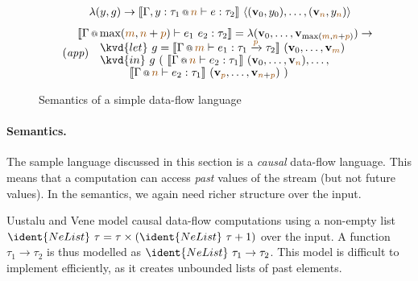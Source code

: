\begin{figure}
\begin{equation}
\begin{array}{l}
  \qquad\lambda (y, g) \rightarrow \sem{ \coctx{\Gamma,y:\tau_1}{\aclrd{n}} \vdash e : \tau_2 
    }~\langle (\mathbf{v}_0, y_0), \ldots, (\mathbf{v}_{ \aclrd{n}  }, y_{ \aclrd{n} } ) \rangle
\end{array}
\end{equation}
\vspace{-0.5em}
\begin{equation*}
\tag{\emph{app}}
\hspace{-1.5em}
\begin{array}{l}
  \sem{\coctx{\Gamma}{\textnormal{max}(\aclrd{m}, \aclrd{n}+\aclrd{p})} \vdash e_1~e_2 : \tau_2 } = 
    \lambda (\mathbf{v}_0, \ldots, \mathbf{v}_{ \textnormal{max}(\aclrd{m}, \aclrd{n}+\aclrd{p}) } ) \rightarrow \\[-0.1em]
  \qquad\kvd{let}~g=\sem{ \coctx{\Gamma}{\aclrd{m}} \vdash e_1 : \tau_1 \xrightarrow{\aclrd{p}} \tau_2 
    }~(\mathbf{v}_0, \ldots, \mathbf{v}_{ \aclrd{m} })\\[-0.1em]
  \qquad\kvd{in}~g~(~\sem{ \coctx{\Gamma}{\aclrd{n}} \vdash e_2 : \tau_1 }~(\mathbf{v}_0, \ldots, \mathbf{v}_{ \aclrd{n} }),\ldots, \\[-0.1em]
  \qquad\qquad\;~\sem{ \coctx{\Gamma}{\aclrd{n}} \vdash e_2 : \tau_1 }~(\mathbf{v}_{ \aclrd{p} }, \ldots, \mathbf{v}_{ \aclrd{n}+\aclrd{p} })~)
\end{array}
\end{equation*}

\caption{Semantics of a simple data-flow language}
\label{fig:applications-flat-dfsem}
\end{figure}


\paragraph{Semantics.}
The sample language discussed in this section is a \emph{causal} data-flow language. This means that
a computation can access \emph{past} values of the stream (but not future values). In the semantics, 
we again need richer structure over the input.

Uustalu and Vene \cite{comonads-notions} model causal data-flow computations using a non-empty list
$\ident{NeList}~\tau = \tau \times (\ident{NeList}~\tau + 1)$ over the input. A function $\tau_1 \rightarrow \tau_2$
is thus modelled as $\ident{NeList}~\tau_1 \rightarrow \tau_2$. This model is difficult to implement
efficiently, as it creates unbounded lists of past elements.

